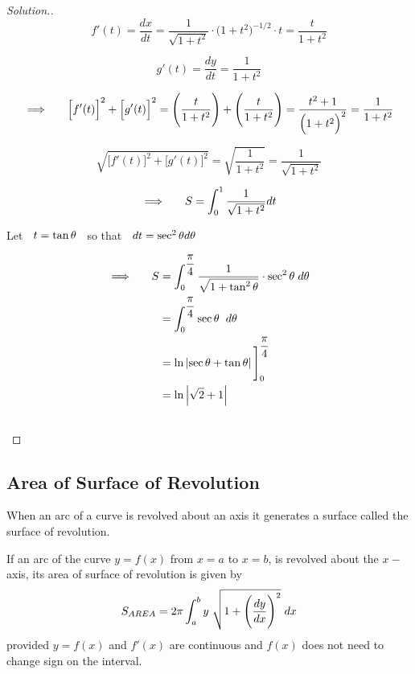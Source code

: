\documentclass[11pt,a4paper]{article}
\theoremstyle{definition}
\newenvironment{solution}
  {\renewcommand{\qedsymbol}{}\begin{proof}[\textit{Solution}.]}
  {\end{proof}}
\begin{document}
\begin{solution}
$$f'(t) = \dfrac{dx}{dt} = \dfrac{1}{\sqrt{1 + t^2}}\cdot \Big(1 + t^2\Big)^{-1/2}\cdot t= \frac{t}{1 + t^2}$$


$$g'(t) = \dfrac{dy}{dt} = \frac{1}{1 + t^2}$$


$$\implies\hspace{0.5cm} \Big[f'(t)\Big]^2 + \Big[g'(t)\Big]^2 = \Bigg(\dfrac{t}{1 + t^2}\Bigg)+ \Bigg(\dfrac{t}{1 + t^2}\Bigg)  = \frac{t^2 + 1}{\Big(1 + t^2\Big)^2} = \dfrac{1}{1 + t^2}$$


$$\sqrt{\Big[f'(t)\Big]^2 + \Big[g'(t)\Big]^2} = \sqrt{\dfrac{1}{1 + t^2}} = \dfrac{1}{\sqrt{1 + t^2}}$$


$$\implies \hspace{0.5cm} S = \int^1_0 \dfrac{1}{\sqrt{1 + t^2}}dt$$

Let $\hspace{0.2cm} t = \tan \theta\hspace{0.2cm}$ so that $\hspace{0.2cm} dt = \sec^2\theta d\theta$

\begin{align*}
\implies\hspace{0.5cm} S & = \int^{\dfrac{\pi}{4}}_0 \dfrac{1}{\sqrt{1 + \tan^2\theta}}\cdot \sec^2\theta \hspace{0.1cm}d\theta\\
& =  \int^{\dfrac{\pi}{4}}_0\sec \theta \hspace{0.2cm}d\theta\\
& = \ln \left|\sec \theta + \tan \theta\right|\Bigg]_0^{\dfrac{\pi}{4}}\\
& = \ln\left|\sqrt{2} + 1\right|\\\\
\end{align*}
\end{solution}

\subsection{Area of Surface of Revolution}


When an arc of a curve is revolved about an axis it generates a surface called the surface of revolution.


If an arc of the curve $y = f(x)$ from $x = a$ to $x = b$, is revolved about the $x-$axis, its area of surface of revolution is given by $$S_{AREA} = 2\pi \int^b_a y \hspace{0.1cm} \sqrt{1 + \Bigg(\dfrac{dy}{dx}\Bigg)^2}\hspace{0.1cm} dx$$
provided $y = f(x)$ and $f'(x)$ are continuous and $f(x)$ does not need to change sign on  the interval.
\end{document}
